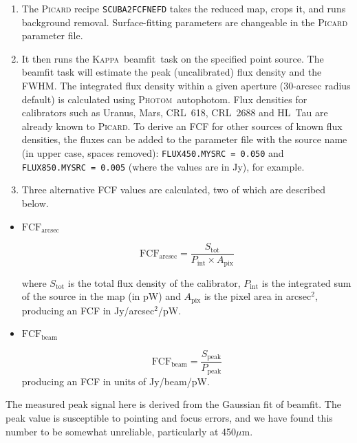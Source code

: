 \documentclass[twoside,11pt]{article}
\newcommand{\xref}[3]{#1}
\renewcommand{\_}{\texttt{\symbol{95}}}
\newcommand{\fcfb}{$\mathrm{FCF_{beam}}$}
\newcommand{\fcfa}{$\mathrm{FCF_{arcsec}}$}
\newcommand{\Kappa}{\xref{\textsc{Kappa}}{sun95}{}}
\newcommand{\photom}{\xref{\textsc{Photom}}{sun45}{}}
\newcommand{\picard}{\xref{\textsc{Picard}}{sun265}{}}
\newcommand{\drrecipe}[1]{\texttt{#1}}
\newcommand{\task}[1]{\textsf{#1}}
\newcommand{\beamfit}{\xref{\task{beamfit}}{sun95}{BEAMFIT}}
\newcommand{\autophotom}{\xref{\task{autophotom}}{sun45}{AUTOPHOTOM}}
\begin{document}
\begin{enumerate}
\item{The \textsc{Picard} recipe \drrecipe{SCUBA2\_FCFNEFD} takes the reduced
map, crops it, and runs background removal. Surface-fitting
parameters are changeable in the \textsc{Picard} parameter file.}
\item{It then runs the \Kappa\ \beamfit\ task on the specified point
source. The \task{beamfit} task will estimate the peak (uncalibrated)
flux density and the FWHM. The integrated flux density within a
given aperture (30-arcsec radius default) is calculated using
\photom\ \autophotom. Flux densities for calibrators such as Uranus,
Mars, CRL~618, CRL~2688 and HL~Tau are already known to
\picard. To derive an FCF for other sources of known flux densities,
the fluxes can be added to the parameter file with the source name
(in upper case, spaces removed): \texttt{FLUX\_450.MYSRC~=~0.050}
and \texttt{FLUX\_850.MYSRC~=~0.005} (where the values are in Jy),
for example.}

\item {Three alternative FCF values are calculated, two of which are
described below.}
\end{enumerate}

\begin{itemize}

\item{\textbf{\fcfa}}

\begin{equation}
\label{eq:fcf_arcsec}
\mathrm{FCF_{arcsec}} = \frac{S_\mathrm{tot}}{P_\mathrm{int} \times
A_\mathrm{pix}}
\end{equation}

where $S_\mathrm{tot}$ is the total flux density of the calibrator,
$P_\mathrm{int}$ is the integrated sum of the source in the map (in
pW) and $A_\mathrm{pix}$ is the pixel area in arcsec$^2$, producing an
FCF in Jy/arcsec$^2$/pW.

\item{\textbf{\fcfb}}

\begin{equation}
\label{eq:fcf_beam}
\mathrm{FCF_{beam}} = \frac{S_\mathrm{{peak}}}{P_\mathrm{peak}}
\end{equation}
producing an FCF in units of Jy/beam/pW.
\end{itemize}

The measured peak signal here is derived from the Gaussian fit of
\task{beamfit}. The peak value is susceptible to pointing and focus errors,
and we have found this number to be somewhat unreliable, particularly
at 450$\mu$m.
\end{document}
